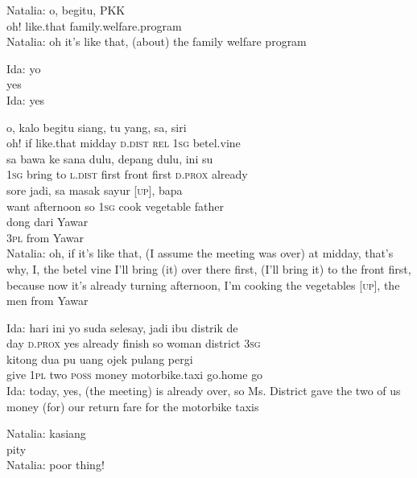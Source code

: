 \ea
\gll   Natalia:   o,   begitu,   PKK\\
  {}   oh!   like.that   family.welfare.program\\
\glt
Natalia: oh it’s like that, (about) the family welfare program
\z

\ea
\gll   Ida:   yo\\
 {}    yes\\
\glt
Ida: yes
\z

\ea
{}    {o,}    {kalo}    {begitu}    {siang,}    {tu}    {yang,}    {sa,}   siri\\
   {}    {oh!}    {if}    {like.that}    {midday}    {\textsc{d.dist}}    {\textsc{rel}}    {\textsc{1sg}}   betel.vine\\
\gll     sa    {bawa}    {ke}    {sana}    {dulu,}    {depang}   dulu,    {ini}    {su}\\
  \textsc{1sg}    {bring}    {to}    {\textsc{l.dist}}    {first}    {front}   first    {\textsc{d.prox}}    {already}\\
    {sore}    {jadi,}    {sa}    {masak}    {sayur}    {\upshape\textsc{[up]},}    {bapa}\\
   {want}    {afternoon}    {so}    {\textsc{1sg}}    {cook}    {vegetable}    {}    {father}\\
\gll  dong    {dari}    {Yawar}\\
  \textsc{3pl}    {from}    {Yawar}\\
\glt
Natalia: oh, if it’s like that, (I assume the meeting was over) at midday, that’s why, I, the betel vine I’ll bring (it) over there first, (I’ll bring it) to the front first, because now it’s already turning afternoon, I’m cooking the vegetables [\textsc{up}], the men from Yawar
\z

\ea
\gll   Ida:    {hari}    {ini}    {yo}    {suda}    {selesay,}   jadi    {ibu}    {distrik}   de\\
 {}      {day}    {\textsc{d.prox}}    {yes}    {already}    {finish}   so    {woman}    {district}   \textsc{3sg}\\
    {kitong}    {dua}    {pu}    {uang}    {ojek}    {pulang}    {pergi}\\
   {give}    {\textsc{1pl}}    {two}    {\textsc{poss}}    {money}    {motorbike.taxi}    {go.home}    {go}\\
\glt
Ida: today, yes, (the meeting) is already over, so Ms. District gave the two of us money (for) our return fare for the motorbike taxis
\z

\ea
\gll   Natalia:   kasiang\\
  {}    pity\\
\glt
Natalia: poor thing!
\z

